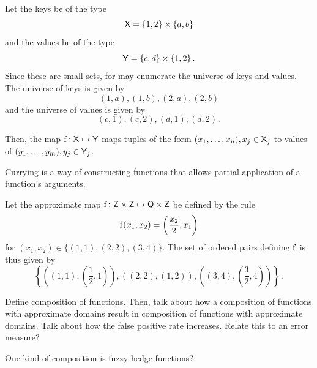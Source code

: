 \documentclass[11pt,final,hidelinks]{article}
\begin{document}
\begin{example}
Let the keys be of the type
\begin{equation}
    \Set{X} = \{1,2\} \times \{a,b\}
\end{equation}
and the values be of the type
\begin{equation}
    \Set{Y} = \{c,d\} \times \{1,2\}\,.
\end{equation}
Since these are small sets, for may enumerate the universe of keys and values.
The universe of keys is given by
\begin{equation}
    (1,a),(1,b),(2,a),(2,b)
\end{equation}
and the universe of values is given by
\begin{equation}
    (c,1),(c,2),(d,1),(d,2)\,.
\end{equation}
\end{example}


Then, the map $\Fun{f} \colon \Set{X} \mapsto \Set{Y}$ maps tuples of the form $(x_1,\ldots,x_n), x_j \in \Set{X}_j$ to values of  $(y_1,\ldots,y_m),y_j \in \Set{Y}_j$.

Currying is a way of constructing functions that allows partial application of a function’s arguments.


\begin{example}
Let the approximate map $\Fun{f} \colon \Set{Z} \times \Set{Z} \mapsto \Set{Q} \times \Set{Z}$ be defined by the rule
\begin{equation}
    \Fun{f}(x_1,x_2) = \left(\frac{x_2}{2},x_1\right)
\end{equation}
for $(x_1,x_2) \in \{(1,1),(2,2),(3,4)\}$.
The set of ordered pairs defining $\Fun{f}$ is thus given by
\begin{equation}
    \left\{
        \left((1,1),\left(\frac{1}{2},1\right)\right),
        \left((2,2),\left(1,2\right)\right),
        \left((3,4),\left(\frac{3}{2},4\right)\right)
    \right\}\,.
\end{equation}
\end{example}

Define composition of functions. Then, talk about how a composition of functions with approximate domains result in composition of functions with approximate domains. Talk about how the false positive rate increases. Relate this to an error measure?


One kind of composition is fuzzy hedge functions?


\end{document}
